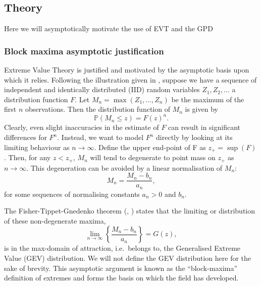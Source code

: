 \documentclass{article}
\numberwithin{equation}{section}
\begin{document}
\subsection{Theory}

Here we will asymptotically motivate the use of EVT and the GPD 



\subsubsection{Block maxima asymptotic justification} \label{subsubsec:asymptotic}


Extreme Value Theory is justified and motivated by the asymptotic basis upon which it relies.
Following the illustration given in \cite{Coles2001}, suppose we have a sequence of independent and identically distributed (IID) random variables $Z_1, Z_2, \ldots$ a distribution function $F$. 
Let $M_n = \max(Z_1, \ldots, Z_n)$ be the maximum of the first $n$ observations. %
Then the distribution function of $M_n$ is given by 
\[
  \mathbb{P}(M_n \le z) = {F(z)}^n.
\]
Clearly, even slight inaccuracies in the estimate of $F$ can result in significant differences for $F^n$.
Instead, we want to model $F^n$ directly by looking at its limiting behaviour as $n \to \infty$.
Define the upper end-point of F as $z_+ = \sup(F)$.
Then, for any $z < z_+$, $M_n$ will tend to degenerate to point mass on $z_+$ as $n \to \infty$.
This degeneration can be avoided by a linear normalisation of $M_n$:
\begin{equation}
  M_n = \frac{M_n - b_n}{a_n},
\end{equation}
for some sequences of normalising constants $a_n > 0$ and $b_n$.

The Fisher-Tippet-Gnedenko theorem (\cite{Fisher1928}, \cite{Gnedenko1943}) states that the limiting or distribution of these non-degenerate maxima,
\begin{equation} 
  \lim_{n \to \infty}\left\{\frac{M_n - b_n}{a_n}\right\} = G(z),
\end{equation}
is in the max-domain of attraction, i.e.\ belongs to, the Generalised Extreme Value (GEV) distribution. 
We will not define the GEV distribution here for the sake of brevity. 
This asymptotic argument is known as the ``block-maxima'' definition of extremes and forms the basis on which the field has developed.
\end{document}
